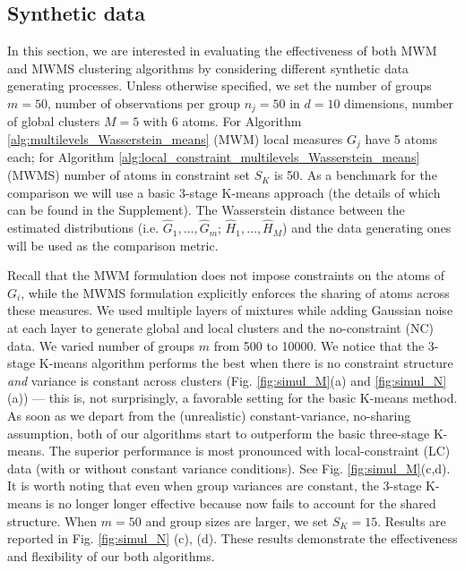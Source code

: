 \subsection{Synthetic data}
In this section, we are interested in evaluating the effectiveness of both
MWM and MWMS clustering algorithms by considering different synthetic data generating processes. 
Unless otherwise specified, we set the number of groups $m=50$, number of observations 
per group $n_{j}=50$ in $d=10$ dimensions, number of global clusters $M=5$ with 6 atoms. 
For Algorithm \ref{alg:multilevels_Wasserstein_means} (MWM)
local measures $G_{j}$ have 5 atoms each; for Algorithm \ref{alg:local_constraint_multilevels_Wasserstein_means} (MWMS) number of atoms in constraint set $S_K$ is 50. 
As a benchmark for the comparison we will use a basic 3-stage K-means approach
(the details of which can be found in the Supplement).
The Wasserstein distance between the estimated distributions (i.e. $\hat 
G_1,\ldots,\hat G_m$; $\hat H_1,\ldots,\hat H_M$) and the data generating ones will
be used as the comparison metric. %

Recall that the MWM formulation does not impose constraints on the atoms of $G_{i}$,
while the MWMS formulation explicitly enforces the sharing of atoms
across these measures.
We used multiple layers of mixtures while adding Gaussian noise at each layer to generate global and local 
clusters and the no-constraint (NC) data. We varied number of groups $m$ 
from 500 to 10000. We notice that the 3-stage K-means algorithm performs the best 
when there is no constraint structure \emph{and} variance is constant across clusters (Fig. 
\ref{fig:simul_M}(a) and \ref{fig:simul_N}(a)) --- this is, not surprisingly, a favorable setting for the basic K-means method.
As soon as we depart from the (unrealistic) constant-variance, no-sharing assumption, both of our
algorithms start to outperform the basic three-stage K-means.
The superior performance is most pronounced with local-constraint (LC) data (with or without constant variance conditions). 
See Fig. \ref{fig:simul_M}(c,d).
It is worth noting that even when group variances are constant, the 3-stage K-means is no longer
longer effective because now fails to account for the shared structure. 
When $m=50$ and group sizes are larger, we set $S_K=15$. Results are reported in 
Fig. \ref{fig:simul_N} (c), (d). 
These results demonstrate the effectiveness and flexibility of our both algorithms.


